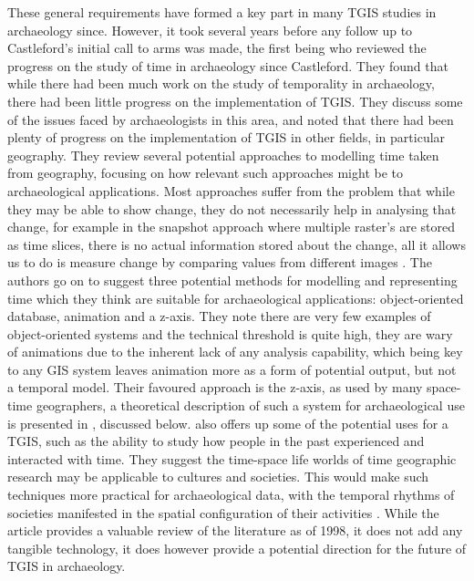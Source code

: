 These general requirements have formed a key part in many TGIS studies in archaeology since. However, it took several years before any follow up to Castleford's initial call to arms was made, the first being \citet{Daly:1999fk} who reviewed the progress on the study of time in archaeology since Castleford. They found that while there had been much work on the study of temporality in archaeology, there had been little progress on the implementation of TGIS. They discuss some of the issues faced by archaeologists in this area, and noted that there had been plenty of progress on the implementation of TGIS in other fields, in particular geography. They review several potential approaches to modelling time taken from geography, focusing on how relevant such approaches might be to archaeological applications. Most approaches suffer from the problem that while they may be able to show change, they do not necessarily help in analysing that change, for example in the snapshot approach where multiple raster's are stored as time slices, there is no actual information stored about the change, all it allows us to do is measure change by comparing values from different images \citep{Daly:1999fk}. The authors go on to suggest three potential methods for modelling and representing time which they think are suitable for archaeological applications: object-oriented database, animation and a z-axis. They note there are very few examples of object-oriented systems and the technical threshold is quite high, they are wary of animations due to the inherent lack of any analysis capability, which being key to any GIS system leaves animation more as a form of potential output, but not a temporal model. Their favoured approach is the z-axis, as used by many space-time geographers, a theoretical description of such a system for archaeological use is presented in \citet{lock2002analysing}, discussed below. \citet{Daly:1999fk} also offers up some of the potential uses for a TGIS, such as the ability to study how people in the past experienced and interacted with time. They suggest the time-space life worlds of time geographic research may be applicable to cultures and societies. This would make such techniques more practical for archaeological data, with the temporal rhythms of societies manifested in the spatial configuration of their activities \citep{Daly:1999fk}. While the article provides a valuable review of the literature as of 1998, it does not add any tangible technology, it does however provide a potential direction for the future of TGIS in archaeology.

